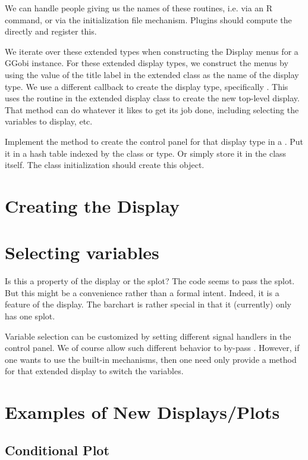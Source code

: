\documentclass{article}
\begin{document}
We can handle people giving us the names of these routines,
i.e. via an R command, or via the initialization file
mechanism. Plugins should compute the 
directly and register this.


We iterate over these extended types when constructing the Display
menus for a GGobi instance. For these extended display types, we
construct the menus by using the value of the title label in the
extended class as the name of the display type.  We use a different
callback to create the display type, specifically
.  This uses the 
routine in the extended display class to create the new top-level
display.  That  method can do whatever it likes
to get its job done, including selecting the variables to display, etc.





Implement the  method to create the control panel
for that display type in a .  Put it in a hash table
indexed by the class or type. Or simply store it in the class itself.
The class initialization should create this object.


\section{Creating the Display}


\section{Selecting variables}

Is this a property of the display or the splot? The code seems to pass
the splot. But this might be a convenience rather than a formal
intent.  Indeed, it is a feature of the display.  The barchart is
rather special in that it (currently) only has one splot.

Variable selection can be customized by setting different signal
handlers in the control panel.  We of course allow such different
behavior to by-pass . However, if one wants to use
the built-in mechanisms, then one need only provide a method for that
extended display to switch the variables.


\section{Examples of New Displays/Plots}
\subsection{Conditional Plot}
\end{document}
